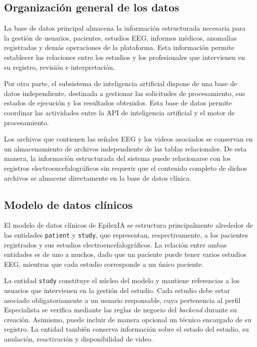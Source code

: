 \subsection{Organización general de los datos}
\label{subsec:organizacion-datos}

La base de datos principal almacena la información
estructurada necesaria para la gestión de usuarios,
pacientes, estudios EEG, informes médicos, anomalías
registradas y demás operaciones de la plataforma.
Esta información permite establecer las relaciones
entre los estudios y los profesionales que intervienen
en su registro, revisión e interpretación.

Por otra parte, el subsistema de inteligencia artificial
dispone de una base de datos independiente, destinada
a gestionar las solicitudes de procesamiento, sus
estados de ejecución y los resultados obtenidos.
Esta base de datos permite coordinar las actividades
entre la API de inteligencia artificial y el motor
de procesamiento.

Los archivos que contienen las señales EEG y los
videos asociados se conservan en un almacenamiento
de archivos independiente de las tablas relacionales.
De esta manera, la información estructurada del
sistema puede relacionarse con los registros
electroencefalográficos sin requerir que el contenido
completo de dichos archivos se almacene directamente
en la base de datos clínica.


\subsection{Modelo de datos clínicos}
\label{subsec:modelo-datos-clinicos}

El modelo de datos clínicos de EpilexIA se estructura
principalmente alrededor de las entidades
\texttt{patient} y \texttt{study}, que representan,
respectivamente, a los pacientes registrados y sus
estudios electroencefalográficos. La relación entre
ambas entidades es de uno a muchos, dado que un
paciente puede tener varios estudios EEG, mientras
que cada estudio corresponde a un único paciente.

La entidad \texttt{study} constituye el núcleo del modelo y mantiene referencias a los usuarios que intervienen en la gestión del estudio. Cada estudio debe estar asociado obligatoriamente a un usuario responsable, cuya pertenencia al perfil Especialista se verifica mediante las reglas de negocio del \textit{backend} durante su creación. Asimismo, puede incluir de manera opcional un técnico encargado de su registro. La entidad también conserva información sobre el estado del estudio, su anulación, reactivación y disponibilidad de video.

